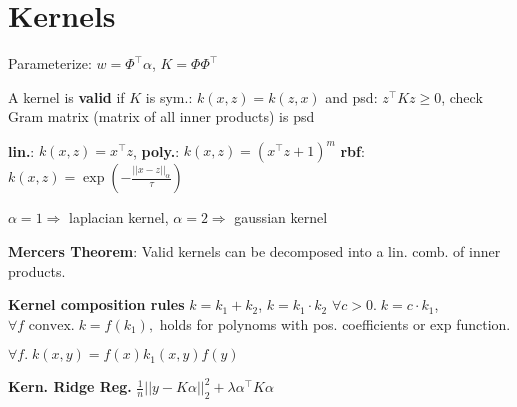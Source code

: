 \section*{Kernels}

Parameterize: $w = \Phi^\top \alpha$, $K = \Phi \Phi^\top$

A kernel is \textbf{valid} if $K$ is sym.: $k(x,z) = k(z,x)$ and psd: $z^\top K z \geq 0$, check Gram matrix (matrix of all inner products) is psd

\textbf{lin.}: $k(x, z) = x^\top z$, \textbf{poly.}: $k(x, z) = (x^\top z + 1)^m$
\textbf{rbf}: $k(x, z) = \exp ( -\frac{||x - z||_\alpha}{\tau} )$

$\alpha = 1 \Rightarrow $ laplacian kernel, $\alpha = 2 \Rightarrow $ gaussian kernel

\textbf{Mercers Theorem}: Valid kernels can be decomposed into a lin. comb. of inner products.

\textbf{Kernel composition rules} $k = k_1 + k_2$, \quad $k = k_1 \cdot k_2$ \quad $\forall c > 0. \; k = c \cdot k_1$,
$\forall f \text{ convex}. \; k = f(k_1), $ holds for polynoms with pos. coefficients or exp function. 

$\forall f. \; k(x,y) = f(x)k_1(x,y)f(y)$

\textbf{Kern. Ridge Reg.}
$\frac{1}{n} ||y - K\alpha ||_2^2 + \lambda \alpha^\top K \alpha$
